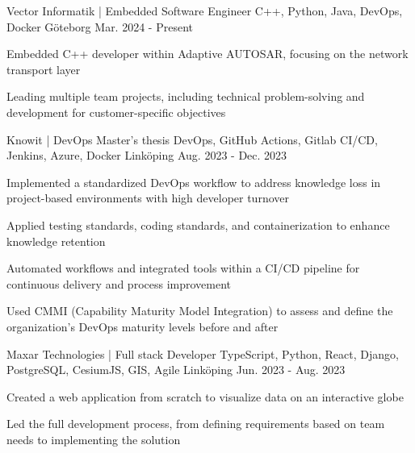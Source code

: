 

\begin{cventries}

  \cventry
    {Vector Informatik | Embedded Software Engineer} %
    {C++, Python, Java, DevOps, Docker} %
    {Göteborg} %
    {Mar. 2024 - Present} %
    {
      \begin{cvitems} %
        \item {Embedded C++ developer within Adaptive AUTOSAR, focusing on the network transport layer}
        \item {Leading multiple team projects, including technical problem-solving and development for customer-specific objectives}
      \end{cvitems}
    }

   \cventry
    {Knowit | DevOps Master's thesis} %
    {DevOps, GitHub Actions, Gitlab CI/CD, Jenkins, Azure, Docker} %
    {Linköping} %
    {Aug. 2023 - Dec. 2023} %
    {
      \begin{cvitems} %
        \item {Implemented a standardized DevOps workflow to address knowledge loss in project-based environments with high developer turnover}
        \item {Applied testing standards, coding standards, and containerization to enhance knowledge retention}
        \item {Automated workflows and integrated tools within a CI/CD pipeline for continuous delivery and process improvement}
        \item {Used CMMI (Capability Maturity Model Integration) to assess and define the organization’s DevOps maturity levels before and after}
      \end{cvitems}
    }

  \cventry
    {Maxar Technologies | Full stack Developer} %
    {TypeScript, Python, React, Django, PostgreSQL, CesiumJS, GIS, Agile} %
    {Linköping} %
    {Jun. 2023 - Aug. 2023} %
    {
      \begin{cvitems} %
        \item {Created a web application from scratch to visualize data on an interactive globe}
        \item {Led the full development process, from defining requirements based on team needs to implementing the solution}
      \end{cvitems}
    }

\end{cventries}